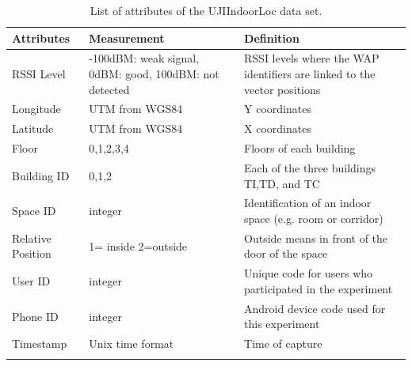 \begin{table}[!ht]
\centering
\caption{ List of attributes of the UJIIndoorLoc data set.}
\small
    \begin{tabular}{ p{4cm} p{4.5cm} p{4.5cm} }
    \hline
    \textbf{Attributes} & \textbf{Measurement} & \textbf{Definition} \\ \hline
    \midrule
    RSSI Level             &    -100dBM: weak signal, 0dBM: good, 100dBM: not detected    & RSSI levels where the WAP identifiers are linked to the vector positions           
    \\\hline
    Longitude              &    UTM from WGS84     &  Y coordinates           \\\hline
    Latitude               &    UTM from WGS84     &  X coordinates          \\\hline
    Floor                  &    0,1,2,3,4     &  Floors of each building           
    \\\hline
    Building ID            &    0,1,2     &  Each of the three buildings TI,TD, and TC          
    \\\hline
    Space ID               &    integer   & Identification of an indoor space (e.g. room or corridor)            
    \\\hline
    Relative Position      &    1= inside 2=outside       & Outside means in front of the door of the space \\\hline
    User ID                &    integer    &  Unique code for users who participated in the experiment           \\\hline
    Phone ID               &    integer      &    Android device code used for this experiment        \\\hline
    Timestamp              &    Unix time format      &  Time of capture           
    \\
    \bottomrule
\label{featuj}
\end{tabular}
\end{table}




